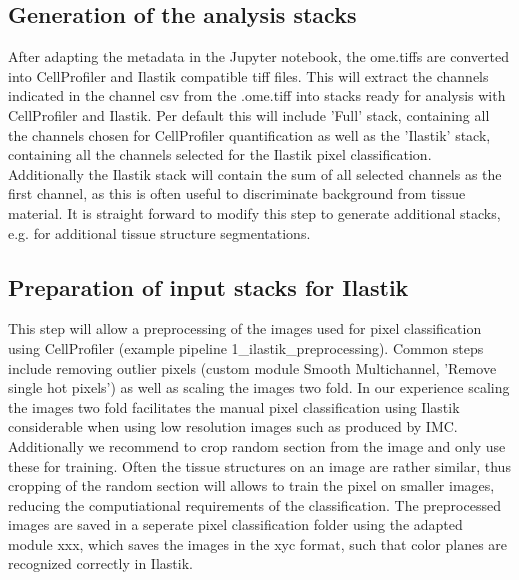 \documentclass[a4paper]{article}
\begin{document}
\subsection{Generation of the analysis stacks}
After adapting the metadata in the Jupyter notebook, the ome.tiffs are converted into CellProfiler
and Ilastik compatible tiff files. This will extract
the channels indicated in the channel csv from the .ome.tiff into stacks ready for analysis with
CellProfiler and Ilastik. Per default this will include 'Full' stack, containing all 
the channels chosen for CellProfiler quantification as well as the 'Ilastik' stack, containing all the
channels selected for the Ilastik pixel classification. Additionally the Ilastik stack will contain
the sum of all selected channels as the first channel, as this is often useful to discriminate
background from tissue material. It is straight forward to modify this step to generate additional
stacks, e.g. for additional tissue structure segmentations.

\subsection{Preparation of input stacks for Ilastik}
This step will allow a preprocessing of the images used for pixel classification using CellProfiler (example
pipeline 1\_ilastik\_preprocessing). Common steps include removing outlier pixels (custom module Smooth Multichannel, 'Remove single hot pixels') as well as scaling the
images two fold. In our experience scaling the images two fold facilitates the manual pixel
classification using Ilastik considerable when using low resolution images such as produced by IMC.
Additionally we recommend to crop random section from the image and only use these for training.
Often the tissue structures on an image are rather similar, thus cropping of the random section will allows to train the pixel
on smaller images, reducing the computiational requirements of the classification.
The preprocessed images are saved in a seperate pixel classification folder using the adapted
module xxx, which saves the images in the xyc format, such that color planes are
recognized correctly in Ilastik.
\end{document}
